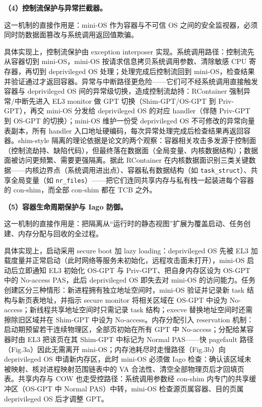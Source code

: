 \documentclass[11pt]{ctexart}
\begin{document}
\noindent\textbf{（4）控制流保护与异常拦截器。}\par
这一机制的直接作用是：mini-OS 作为容器与不可信 OS 之间的安全监视器，必须同时防数据面篡改与系统调用返回值欺骗。\par
具体实现上，控制流保护由 exception interposer 实现。系统调用路径：控制流先从容器切到 mini-OS，mini-OS 按请求信息拷贝系统调用参数、清除敏感 CPU 寄存器，再切到 deprivileged OS 处理；处理完成后控制流回到 mini-OS，检查结果并验证通过才返回容器。异常与中断路径更危险——它们可不经系统调用直接触发容器与 deprivileged OS 间的异常级切换，造成控制流劫持：RContainer 强制异常/中断先进入 EL3 monitor 做 GPT 切换（Shim-GPT/OS-GPT 到 Priv-GPT），再交 mini-OS 分发给 deprivileged OS 的对应 handler（伴随 Priv-GPT 到 OS-GPT 的切换）；mini-OS 维护一份受 deprivileged OS 不可修改的异常向量表副本，所有 handler 入口地址硬编码，每次异常处理完成后检查结果再返回容器。shim-style 隔离的理论依据是论文的两个观察：容器相关攻击多发源于控制面（控制流劫持、缺陷代码），但最终落在数据面（全局变量、内核数据结构）；数据面被访问更频繁、需要更强隔离。据此 RContainer 在内核数据面识别三类关键数据——内核边界点（系统调用进出点）、容器私有数据结构（如 \texttt{task\_struct}）、共享全局变量（如 \texttt{nr\_files}）——把它们连同共享内存与私有栈一起装进每个容器的 con-shim，而全部 con-shim 都在 TCB 之外。\par
\noindent\textbf{（5）容器生命周期保护与 Iago 防御。}\par
这一机制的直接作用是：把隔离从“运行时的静态视图”扩展为覆盖启动、任务创建、内存分配与回收的全过程。\par
具体实现上，启动采用 secure boot 加 lazy loading：deprivileged OS 先被 EL3 加载度量并正常启动（此时网络等服务未初始化，远程攻击面未打开），mini-OS 启动后立即通知 EL3 初始化 OS-GPT 与 Priv-GPT、把自身内存区设为 OS-GPT 中的 No-access PAS，此后 deprivileged OS 即失去对 mini-OS 的访问能力。任务创建区分三种情形：新进程拥有独立地址空间时，mini-OS 验证并记录新 task 结构与新页表地址，并指示 secure monitor 将相关区域在 OS-GPT 中设为 No-access；新线程共享地址空间时只需记录 task 结构；execve 替换地址空间时还需擦除旧区域并在 Shim-GPT 中设为 No-access。内存分配引入 reservation 机制：启动期预留若干连续物理区，全部页初始在所有 GPT 中 No-access；分配给某容器时由 EL3 把该页在其 Shim-GPT 中标记为 Normal PAS——快 pagefault 路径（Fig.3a）因此无需离开 mini-OS；内存池耗尽时走慢路径（Fig.3b）向 deprivileged OS 申请新内存区，此时 mini-OS 必须做 Iago 检查：确认该区域未被映射、核对进程映射范围链表中的 VA 合法性、清空全部物理页后才回填页表。共享内存与 COW 也走受控路径：系统调用参数经 con-shim 内专门的共享缓冲区（OS-GPT 中 Normal PAS）中转，mini-OS 检查源页属容器、目的页属 deprivileged OS 后才调整 GPT。\par
\end{document}

